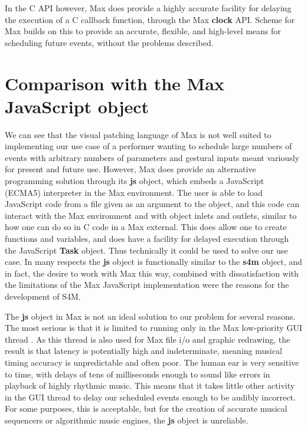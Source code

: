 \documentclass[acmsmall, anonymous, review]{acmart}
\begin{document}
In the C API however, Max does provide a highly accurate facility for delaying
the execution of a C callback function, through the Max \textbf{clock} API. Scheme
for Max builds on this to provide an accurate, flexible, and high-level means 
for scheduling future events, without the problems described.

\section{Comparison with the Max JavaScript object}

We can see that the visual patching language of Max is not well suited to implementing
our use case of a performer wanting to schedule large numbers of events with arbitrary numbers of
parameters and gestural inputs meant variously for present and future use. 
However, Max does provide an alternative programming solution through its
\textbf{js} object, which embeds a JavaScript (ECMA5) interpreter in the Max environment.
The user is able to load JavaScript code from a file given as an argument to the object,
and this code can interact with the Max environment and with object inlets and outlets,
similar to how one can do so in C code in a Max external.
This does allow one to create functions and variables, and does have a facility
for delayed execution through the JavaScript \textbf{Task} object. 
Thus technically it could be used to solve our use case.
In many respects the \textbf{js} object is functionally similar to the \textbf{s4m} object,
and in fact, the desire to work with Max this way, combined with dissatisfaction with the
limitations of the Max JavaScript implementation were the reasons for the development of S4M.

The \textbf{js} object in Max is not an ideal solution to our problem for several reasons. 
The most serious is that it is limited to running only in the Max low-priority GUI thread \cite{Cycling74}.
As this thread is also used for Max file i/o and graphic redrawing, the result is that latency
is potentially high and indeterminate, meaning musical timing accuracy is unpredictable and often poor.
The human ear is very sensitive to time, with delays of tens of milliseconds enough to sound like errors in playback
of highly rhythmic music. This means that it takes little other activity in the
GUI thread to delay our scheduled events enough to be audibly incorrect. 
For some purposes, this is acceptable, but for the creation of accurate 
musical sequencers or algorithmic music engines, the \textbf{js} object is unreliable. 
\end{document}

